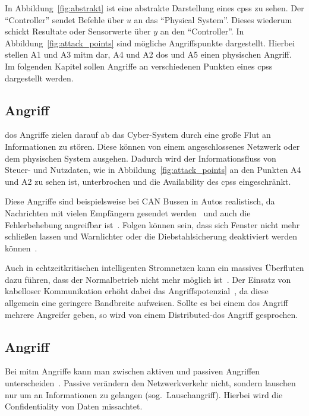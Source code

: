 \documentclass[final,bibliography=totocnumbered]{include/sikseminar}
\newcommand{\cps}{\glspl{cps}\xspace}
\begin{document}
    In Abbildung~\ref{fig:abstrakt} ist eine abstrakte Darstellung eines \cps zu sehen.
    Der \enquote{Controller} sendet Befehle über $u$ an das \enquote{Physical System}.
    Dieses wiederum schickt Resultate oder Sensorwerte über $y$ an den \enquote{Controller}.
    In Abbildung~\ref{fig:attack_points} sind mögliche Angriffspunkte dargestellt.
    Hierbei stellen A1 und A3 \gls{mitm} dar, A4 und A2 \gls{dos} und A5 einen physischen Angriff.
    Im folgenden Kapitel sollen Angriffe an verschiedenen Punkten eines \cps dargestellt werden.


    \subsection{ Angriff}
    \label{subsec:dos}
    \gls{dos} Angriffe zielen darauf ab das Cyber-System durch eine große Flut an Informationen zu stören.
    Diese können von einem angeschlossenes Netzwerk oder dem physischen System ausgehen.
    Dadurch wird der Informationsfluss von Steuer- und Nutzdaten, wie in Abbildung~\ref{fig:attack_points} an den Punkten A4 und A2 zu sehen ist, unterbrochen und die Availability des \cps eingeschränkt.

    Diese Angriffe sind beispielsweise bei CAN Bussen in Autos realistisch, da Nachrichten mit vielen Empfängern gesendet werden~\cite{KCR+10} und auch die Fehlerbehebung angreifbar ist~\cite{CDV13}.
    Folgen können sein, dass sich Fenster nicht mehr schließen lassen und Warnlichter oder die Diebstahlsicherung deaktiviert werden können~\cite{HKD08}.

    Auch in echtzeitkritischen intelligenten Stromnetzen kann ein massives Überfluten dazu führen, dass der Normalbetrieb nicht mehr möglich ist~\cite{LLW+10}.
    Der Einsatz von kabelloser Kommunikation erhöht dabei das Angriffspotenzial~\cite{LWW11}, da diese allgemein eine geringere Bandbreite aufweisen.
    Sollte es bei einem \gls{dos} Angriff mehrere Angreifer geben, so wird von einem Distributed-\acrlong{dos} Angriff gesprochen.


    \subsection{ Angriff}
    \label{subsec:mitm}
    Bei \gls{mitm} Angriffe kann man zwischen aktiven und passiven Angriffen unterscheiden~\cite{WYX+10}.
    Passive verändern den Netzwerkverkehr nicht, sondern lauschen nur um an Informationen zu gelangen (sog.\ Lauschangriff).
    Hierbei wird die Confidentiality von Daten missachtet.
\end{document}
